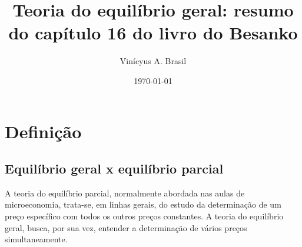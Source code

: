 \documentclass[oneside,12pt, letterpaper]{book}
\title{Teoria do equil{\'i}brio geral: resumo do cap{\'i}tulo 16 do livro do Besanko}
\date{\today}
\author {Vin{\' i}cyus A. Brasil}
\begin{document}
\maketitle
\date{}

\chapter{Defini{\c c}{\~a}o} 
\section{Equil{\'i}brio geral x equil{\'i}brio parcial}
A teoria do equil{\'i}brio parcial, normalmente abordada nas aulas de microeconomia, trata-se, em linhas gerais, do estudo da determina{\c c}{\~a}o de um 
pre{\c c}o espec{\'i}fico com todos os outros pre{\c c}os constantes. A teoria do equil{\'i}brio geral, busca, por sua vez, entender a determina{\c c}{\~a}o de v{\'a}rios pre{\c c}os 
simultaneamente. 
\end{document}
